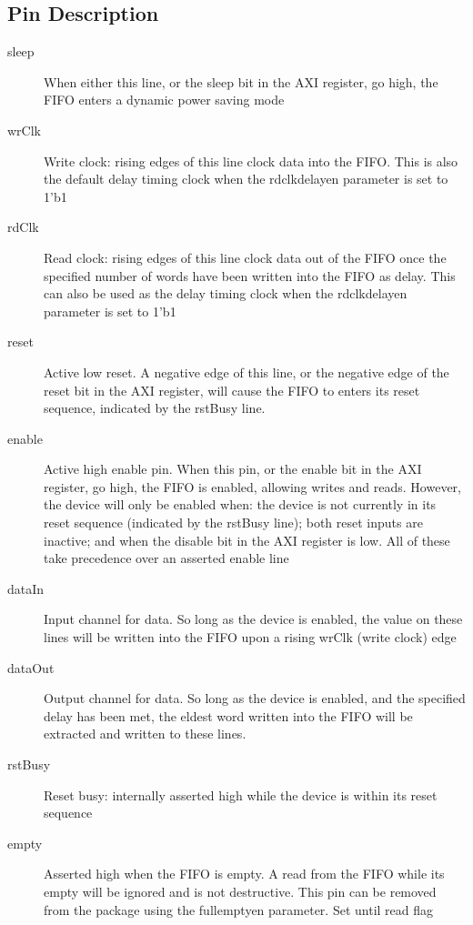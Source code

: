 \documentclass[11pt]{article}
\begin{document}
\subsection{Pin Description}
\begin{description}
	\item[sleep]When either this line, or the sleep bit in the AXI register, go high, the FIFO enters a dynamic power saving mode
	\item[wrClk]Write clock: rising edges of this line clock data into the FIFO. This is also the default delay timing clock when the 
		rd\textunderscore clk\textunderscore delay\textunderscore en parameter is set to 1'b1 
	\item[rdClk]Read clock: rising edges of this line clock data out of the FIFO once the specified number of words have been written into the FIFO as
		delay. This can also be used as the delay timing clock when the rd\textunderscore clk\textunderscore delay\textunderscore en parameter is set to
		1'b1
	\item[reset]Active low reset. A negative edge of this line, or the negative edge of the reset bit in the AXI register, will cause the
		FIFO to enters its reset sequence, indicated by the rstBusy line.
	\item[enable]Active high enable pin. When this pin, or the enable bit in the AXI register, go high, the FIFO is enabled, allowing writes and reads.
		However, the device will only be enabled when: the device is not currently in its reset sequence (indicated by the rstBusy line); both reset
		inputs are inactive; and when the disable bit in the AXI register is low. All of these take precedence over an asserted enable line
	\item[dataIn]Input channel for data. So long as the device is enabled, the value on these lines will be written into the FIFO upon a rising
		wrClk (write clock) edge
	\item[dataOut]Output channel for data. So long as the device is enabled, and the specified delay has been met, the eldest word written into the FIFO
		will be extracted and written to these lines.
	\item[rstBusy]Reset busy: internally asserted high while the device is within its reset sequence
	\item[empty]Asserted high when the FIFO is empty. A read from the FIFO while its empty will be ignored and is not destructive. This pin can be removed
		from the package using the full\textunderscore empty\textunderscore en parameter. Set until read flag

\end{description}
\end{document}
